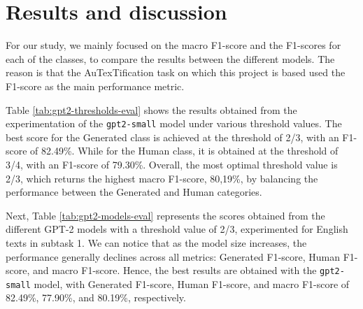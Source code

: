 \documentclass[a4paper,11pt,twocolumn,twoside]{article}
\begin{document}
\section{Results and discussion}
For our study, we mainly focused on the macro F1-score and the F1-scores for each of the classes, to compare the results between the different models. The reason is that the AuTexTification task on which this project is based used the F1-score as the main performance metric.

Table \ref{tab:gpt2-thresholds-eval} shows the results obtained from the experimentation of the \texttt{gpt2-small} model under various threshold values. %
The best score for the Generated class is achieved at the threshold of 2/3, with an F1-score of 82.49\%. While for the Human class, it is obtained at the threshold of 3/4, with an F1-score of 79.30\%.
Overall, the most optimal threshold value is 2/3, which returns the highest macro F1-score, 80,19\%, by balancing the performance between the Generated and Human categories. 
\begin{table}[!h]
    \centering
    \caption{GPT-2 Small F1-scores with different threshold values (subtask 1 for English).}
    \label{tab:gpt2-thresholds-eval}
\end{table}

Next, Table \ref{tab:gpt2-models-eval} represents the scores obtained from the different GPT-2 models with a threshold value of 2/3, experimented for English texts in subtask 1. We can notice that as the model size increases, the performance generally declines across all metrics: Generated F1-score, Human F1-score, and macro F1-score.  Hence, the best results are obtained with the \texttt{gpt2-small} model, with Generated F1-score, Human F1-score, and macro F1-score of 82.49\%, 77.90\%, and 80.19\%, respectively.
\end{document}
